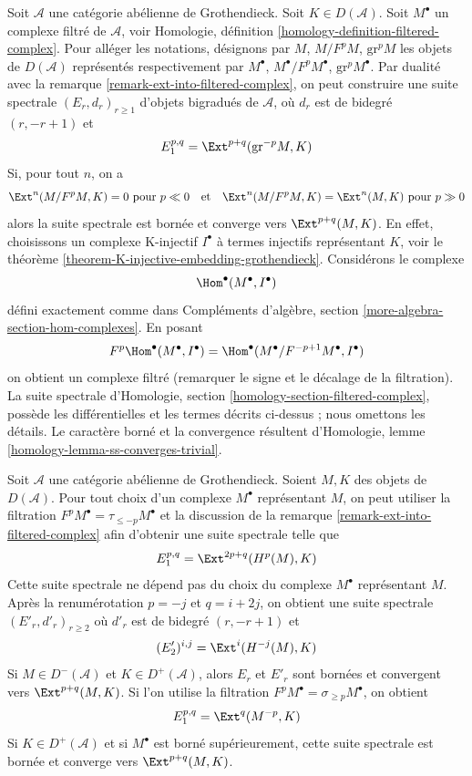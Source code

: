 \begin{remark}
\label{remark-ext-from-filtered-complex}
Soit $\mathcal{A}$ une catégorie abélienne de Grothendieck. Soit
$K \in D(\mathcal{A})$. Soit $M^\bullet$ un complexe filtré de
$\mathcal{A}$, voir Homologie, définition
\ref{homology-definition-filtered-complex}. Pour alléger les notations,
désignons par $M$, $M/F^pM$, $\text{gr}^pM$ les objets de
$D(\mathcal{A})$ représentés respectivement par $M^\bullet$,
$M^\bullet/F^pM^\bullet$, $\text{gr}^pM^\bullet$. Par dualité avec la
remarque \ref{remark-ext-into-filtered-complex}, on peut construire une suite
spectrale $(E_r, d_r)_{r \geq 1}$ d'objets bigradués de $\mathcal{A}$, où
$d_r$ est de bidegré $(r, -r + 1)$ et
$$
E_1^{p, q} = \Ext^{p + q}(\text{gr}^{-p}M, K)
$$
Si, pour tout $n$, on a
$$
\Ext^n(M/F^pM, K) = 0 \text{ pour } p \ll 0
\quad\text{et}\quad
\Ext^n(M/F^pM, K) = \Ext^n(M, K) \text{ pour } p \gg 0
$$
alors la suite spectrale est bornée et converge vers $\Ext^{p + q}(M, K)$.
En effet, choisissons un complexe K-injectif $I^\bullet$ à termes injectifs
représentant $K$, voir le théorème
\ref{theorem-K-injective-embedding-grothendieck}. Considérons le complexe
$$
\Hom^\bullet(M^\bullet, I^\bullet)
$$
défini exactement comme dans Compléments d'algèbre, section
\ref{more-algebra-section-hom-complexes}. En posant
$$
F^p\Hom^\bullet(M^\bullet, I^\bullet) =
\Hom^\bullet(M^\bullet/F^{-p + 1}M^\bullet, I^\bullet)
$$
on obtient un complexe filtré (remarquer le signe et le décalage de la
filtration). La suite spectrale d'Homologie, section
\ref{homology-section-filtered-complex}, possède les différentielles et les
termes décrits ci-dessus ; nous omettons les détails. Le caractère borné et la
convergence résultent d'Homologie, lemme
\ref{homology-lemma-ss-converges-trivial}.
\end{remark}

\begin{remark}
\label{remark-spectral-sequences-ext-variant}
Soit $\mathcal{A}$ une catégorie abélienne de Grothendieck.
Soient $M, K$ des objets de $D(\mathcal{A})$.
Pour tout choix d'un complexe $M^\bullet$ représentant $M$, on peut utiliser
la filtration $F^pM^\bullet = \tau_{\leq -p}M^\bullet$ et la discussion de la
remarque \ref{remark-ext-into-filtered-complex} afin d'obtenir une suite
spectrale telle que
$$
E_1^{p, q} = \Ext^{2p + q}(H^p(M), K)
$$
Cette suite spectrale ne dépend pas du choix du complexe $M^\bullet$
représentant $M$. Après la renumérotation $p = -j$ et $q = i + 2j$, on
obtient une suite spectrale $(E'_r, d'_r)_{r \geq 2}$ où $d'_r$ est de
bidegré $(r, -r + 1)$ et
$$
(E'_2)^{i, j} = \Ext^i(H^{-j}(M), K)
$$
Si $M \in D^-(\mathcal{A})$ et $K \in D^+(\mathcal{A})$, alors $E_r$ et
$E'_r$ sont bornées et convergent vers $\Ext^{p + q}(M, K)$.
Si l'on utilise la filtration $F^pM^\bullet = \sigma_{\geq p}M^\bullet$,
on obtient
$$
E_1^{p, q} = \Ext^q(M^{-p}, K)
$$
Si $K \in D^+(\mathcal{A})$ et si $M^\bullet$ est borné supérieurement,
cette suite spectrale est bornée et converge vers $\Ext^{p + q}(M, K)$.
\end{remark}

